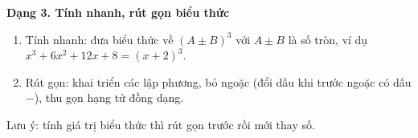 \textbf{Dạng 3. Tính nhanh, rút gọn biểu thức}
\begin{enumerate}
\item Tính nhanh: đưa biểu thức về $(A\pm B)^3$ với $A\pm B$ là số tròn, ví dụ $x^3+6x^2+12x+8=(x+2)^3$.
\item Rút gọn: khai triển các lập phương, bỏ ngoặc (đổi dấu khi trước ngoặc có dấu $-$), thu gọn hạng tử đồng dạng.
\end{enumerate}
Lưu ý: tính giá trị biểu thức thì rút gọn trước rồi mới thay số.

